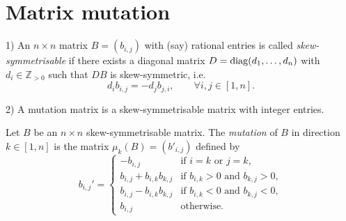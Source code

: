 \chapter{Matrix mutation}

\begin{definition}
    \label{def:mutationMatrix}
    1) An $n\times n$ matrix $B = (b_{i,j})$ with (say) rational entries is called 
    \emph{skew-symmetrisable} if there exists a diagonal matrix $D = {\rm diag}(d_1, \ldots, d_n)$ 
    with $d_i \in \mathbb{Z}_{>0}$ such that $DB$ is skew-symmetric, i.e. 
    \[
        d_ib_{i,j} = -d_jb_{j,i}, \qquad \forall i,j \in [1,n].
    \]

    2) A mutation matrix is a skew-symmetrisable matrix with integer entries.
\end{definition}

\begin{definition}
    \label{def:matrixMutation}
    Let $B$ be an $n \times n$ skew-symmetrisable matrix. The \emph{mutation} of 
    $B$ in direction $k \in [1,n]$ is the matrix $\mu_k(B) = (b'_{i,j})$ defined by
    \[
        b_{i,j}' = \begin{cases}
            -b_{i,j} & \text{if } i = k \text{ or } j = k, \\
            b_{i,j} + b_{i,k}b_{k,j} & \text{if } b_{i,k} >0 \text{ and } b_{k,j} > 0, \\
            b_{i,j} - b_{i,k}b_{k,j} & \text{if } b_{i,k} <0 \text{ and } b_{k,j} < 0, \\
            b_{i,j} & \text{otherwise.}
        \end{cases}
    \]
\end{definition}

